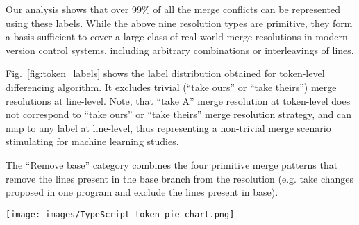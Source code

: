 Our analysis shows that over 99\% of all the merge conflicts can be represented using these labels. While the above nine resolution types are primitive, they form a basis sufficient to cover a large class of real-world merge resolutions in modern version control systems, including arbitrary combinations or interleavings of lines.


Fig.~\ref{fig:token_labels} shows the label distribution obtained for token-level differencing algorithm. It excludes trivial (``take ours'' or ``take theirs'') merge resolutions at line-level. Note, that ``take A'' merge resolution at token-level does not correspond to ``take ours'' or ``take theirs'' merge resolution strategy, and can map to any label at line-level, thus representing a non-trivial merge scenario stimulating for machine learning studies. 

The ``Remove base'' category combines the four primitive merge patterns that remove the lines present in the base branch from the resolution (e.g. take changes proposed in one program and exclude the lines present in base). 


\begin{figure*}
\begin{center}
    \texttt{[image: images/TypeScript\_token\_pie\_chart.png]}
\caption{Summary of merge conflict resolution labels in our dataset for TypeScript: label distribution for merge conflicts extracted with token-level differencing algorithm. }
\label{fig:token_labels}
\end{center}
\end{figure*}


